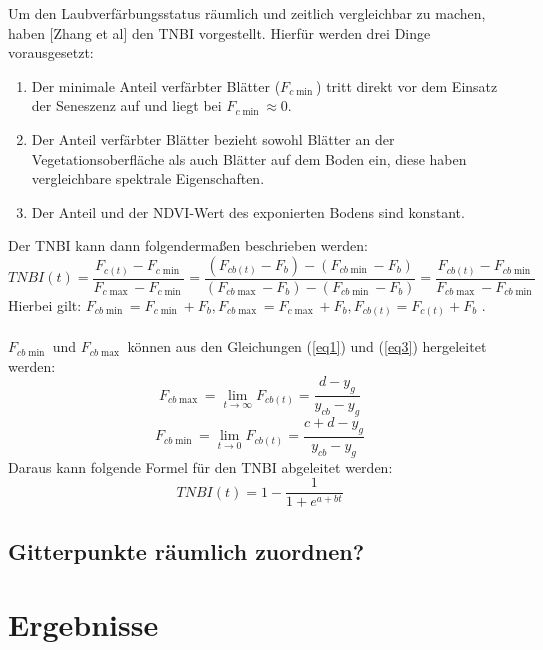 \documentclass[]{article}
\begin{document}
Um den Laubverfärbungsstatus räumlich und zeitlich vergleichbar zu machen, haben [Zhang et al] den TNBI vorgestellt. Hierfür werden drei Dinge vorausgesetzt: 
\begin{enumerate}
\item Der minimale Anteil verfärbter Blätter ($F_{c\min}$) tritt direkt vor dem Einsatz der Seneszenz auf und liegt bei $F_{c\min}\approx 0$.
\item Der Anteil verfärbter Blätter bezieht sowohl Blätter an der Vegetationsoberfläche als auch Blätter auf dem Boden ein, diese haben vergleichbare spektrale Eigenschaften.
\item Der Anteil und der NDVI-Wert des exponierten Bodens sind konstant.
\end{enumerate}
Der TNBI kann dann folgendermaßen beschrieben werden:
\begin{equation}
TNBI(t)=\frac{F_{c(t)}-F_{c\min}}{F_{c\max}-F_{c\min}}=\frac{(F_{cb(t)}-F_b)-(F_{cb\min}-F_b)}{(F_{cb\max}-F_b)-(F_{cb\min}-F_b)}=\frac{F_{cb(t)}-F_{cb\min}}{F_{cb\max}-F_{cb\min}}
\end{equation}
Hierbei gilt: $F_{cb\min}=F_{c\min}+F_b, F_{cb\max}=F_{c\max}+F_b, F_{cb(t)}=F_{c(t)}+F_b$ .
\\ \\
$F_{cb\min}$ und $F_{cb\max}$ können aus den Gleichungen (\ref{eq1}) und (\ref{eq3}) hergeleitet werden:
\begin{equation}
F_{cb\max}=\lim\limits_{t \rightarrow \infty}{F_{cb(t)}}=\frac{d-y_g}{y_{cb}-y_g}
\end{equation}
\begin{equation}
F_{cb\min}=\lim\limits_{t \rightarrow 0}{F_{cb(t)}}=\frac{c+d-y_g}{y_{cb}-y_g}
\end{equation}
Daraus kann folgende Formel für den TNBI abgeleitet werden:
\begin{equation}
TNBI(t)=1-\frac{1}{1+e^{a+bt}}
\end{equation}
\subsection{Gitterpunkte räumlich zuordnen?}
\section{Ergebnisse}
\end{document}
